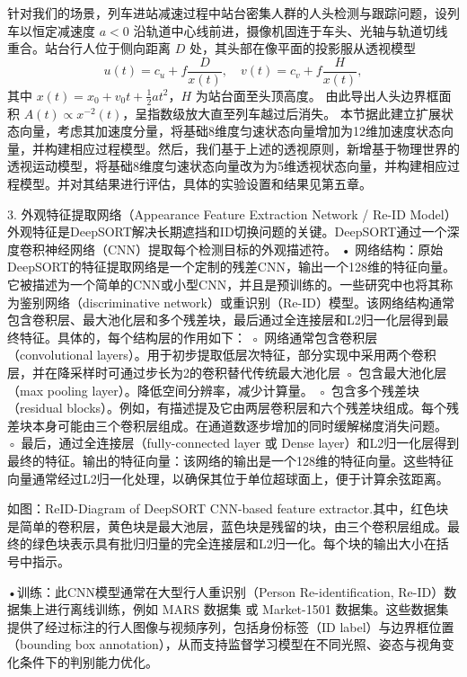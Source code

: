 针对我们的场景，列车进站减速过程中站台密集人群的人头检测与跟踪问题，设列车以恒定减速度 $a<0$ 沿轨道中心线前进，摄像机固连于车头、光轴与轨道切线重合。站台行人位于侧向距离 $D$ 处，其头部在像平面的投影服从透视模型
\begin{equation}
u(t)=c_u+f\dfrac{D}{x(t)},\quad
v(t)=c_v+f\dfrac{H}{x(t)},
\end{equation}
其中 $x(t)=x_0+v_0t+\frac{1}{2}at^{2}$，$H$ 为站台面至头顶高度。  
由此导出人头边界框面积 $A(t)\propto x^{-2}(t)$，呈指数级放大直至列车越过后消失。  
本节据此建立扩展状态向量，考虑其加速度分量，将基础8维度匀速状态向量增加为12维加速度状态向量，并构建相应过程模型。然后，我们基于上述的透视原则，新增基于物理世界的透视运动模型，将基础8维度匀速状态向量改为为5维透视状态向量，并构建相应过程模型。并对其结果进行评估，具体的实验设置和结果见第五章。



3. 外观特征提取网络（Appearance Feature Extraction Network / Re-ID Model）
外观特征是DeepSORT解决长期遮挡和ID切换问题的关键。DeepSORT通过一个深度卷积神经网络（CNN）提取每个检测目标的外观描述符。
• 网络结构：原始DeepSORT的特征提取网络是一个定制的残差CNN，输出一个128维的特征向量。它被描述为一个简单的CNN或小型CNN，并且是预训练的。一些研究中也将其称为鉴别网络（discriminative network）或重识别（Re-ID）模型。该网络结构通常包含卷积层、最大池化层和多个残差块，最后通过全连接层和L2归一化层得到最终特征\cite{116}。具体的，每个结构层的作用如下：
    ◦ 网络通常包含卷积层（convolutional layers）。用于初步提取低层次特征，部分实现中采用两个卷积层，并在降采样时可通过步长为2的卷积替代传统最大池化层
    ◦ 包含最大池化层（max pooling layer）。降低空间分辨率，减少计算量。
    ◦ 包含多个残差块（residual blocks）。例如，有描述提及它由两层卷积层和六个残差块组成。每个残差块本身可能由三个卷积层组成。在通道数逐步增加的同时缓解梯度消失问题。
    ◦ 最后，通过全连接层（fully-connected layer 或 Dense layer）和L2归一化层得到最终的特征。输出的特征向量：该网络的输出是一个128维的特征向量。这些特征向量通常经过L2归一化处理，以确保其位于单位超球面上，便于计算余弦距离。

如图：ReID-Diagram of DeepSORT\cite{211} CNN-based feature extractor.其中，红色块是简单的卷积层，黄色块是最大池层，蓝色块是残留的块，由三个卷积层组成\cite{213}。最终的绿色块表示具有批归归量的完全连接层和L2归一化。每个块的输出大小在括号中指示。

•训练：此CNN模型通常在大型行人重识别（Person Re-identification, Re-ID）数据集上进行离线训练，例如 MARS 数据集\cite{214} 或 Market-1501 数据集\cite{215}。这些数据集提供了经过标注的行人图像与视频序列，包括身份标签（ID label）与边界框位置（bounding box annotation），从而支持监督学习模型在不同光照、姿态与视角变化条件下的判别能力优化。


